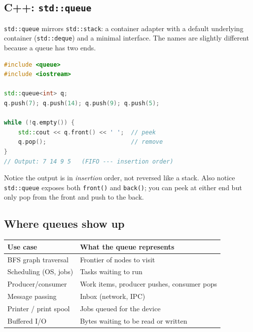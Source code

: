 \documentclass[11pt]{article}
\begin{document}
\subsection*{C++: \texttt{std::queue}}

\texttt{std::queue} mirrors \texttt{std::stack}: a container
adapter with a default underlying container (\texttt{std::deque})
and a minimal interface. The names are slightly different because
a queue has two ends.

\begin{examplebox}
\begin{lstlisting}[language=C++,basicstyle=\ttfamily\small,frame=single]
#include <queue>
#include <iostream>

std::queue<int> q;
q.push(7); q.push(14); q.push(9); q.push(5);

while (!q.empty()) {
    std::cout << q.front() << ' ';  // peek
    q.pop();                        // remove
}
// Output: 7 14 9 5   (FIFO --- insertion order)
\end{lstlisting}
\end{examplebox}

Notice the output is in \emph{insertion} order, not reversed like
a stack. Also notice \texttt{std::queue} exposes both
\texttt{front()} and \texttt{back()}; you can peek at either end
but only pop from the front and push to the back.

\subsection*{Where queues show up}

\begin{center}
\begin{tabular}{|l|l|}
\hline
\textbf{Use case} & \textbf{What the queue represents} \\
\hline
BFS graph traversal   & Frontier of nodes to visit \\
Scheduling (OS, jobs) & Tasks waiting to run \\
Producer/consumer     & Work items, producer pushes, consumer pops \\
Message passing       & Inbox (network, IPC) \\
Printer / print spool & Jobs queued for the device \\
Buffered I/O          & Bytes waiting to be read or written \\
\hline
\end{tabular}
\end{center}
\end{document}
